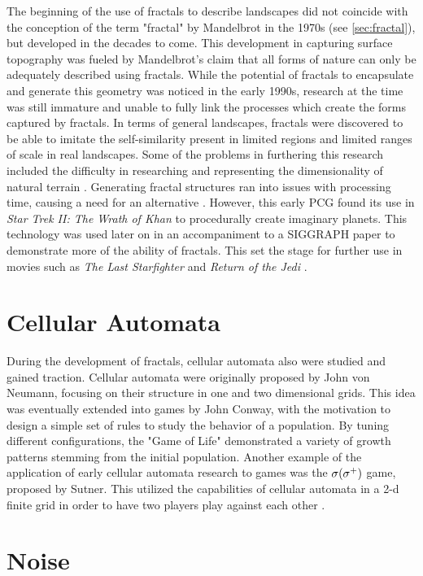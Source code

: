 \documentclass[10pt]{report}
\begin{document}
		The beginning of the use of fractals to describe landscapes did not coincide with the conception of the term "fractal" by Mandelbrot in the 1970s (see \autoref{sec:fractal}), but developed in the decades to come. This development in capturing surface topography was fueled by Mandelbrot's claim that all forms of nature can only be adequately described using fractals. While the potential of fractals to encapsulate and generate this geometry was noticed in the early 1990s, research at the time was still immature and unable to fully link the processes which create the forms captured by fractals. In terms of general landscapes, fractals were discovered to be able to imitate the self-similarity present in limited regions and limited ranges of scale in real landscapes. Some of the problems in furthering this research included the difficulty in researching and representing the dimensionality of natural terrain \cite{XU1993245}. Generating fractal structures ran into issues with processing time, causing a need for an alternative \cite{inbook}. However, this early PCG found its use in \emph{Star Trek II: The Wrath of Khan} \cite{startrek} to procedurally create imaginary planets. This technology was used later on in an accompaniment to a SIGGRAPH paper to demonstrate more of the ability of fractals. This set the stage for further use in movies such as \emph{The Last Starfighter} and \emph{Return of the Jedi} \cite{ibm-fractal}. 
		
		\section{Cellular Automata}
		
		During the development of fractals, cellular automata also were studied and gained traction. Cellular automata were originally proposed by John von Neumann, focusing on their structure in one and two dimensional grids. This idea was eventually extended into games by John Conway, with the motivation to design a simple set of rules to study the behavior of a population. By tuning different configurations, the "Game of Life" demonstrated a variety of growth patterns stemming from the initial population. Another example of the application of early cellular automata research to games was the \(\sigma(\sigma\textsuperscript{+})\) game, proposed by Sutner. This utilized the capabilities of cellular automata in a 2-d finite grid in order to have two players play against each other \cite{10.1145/349194.349202}.
		
		\section{Noise}
		
\end{document}
